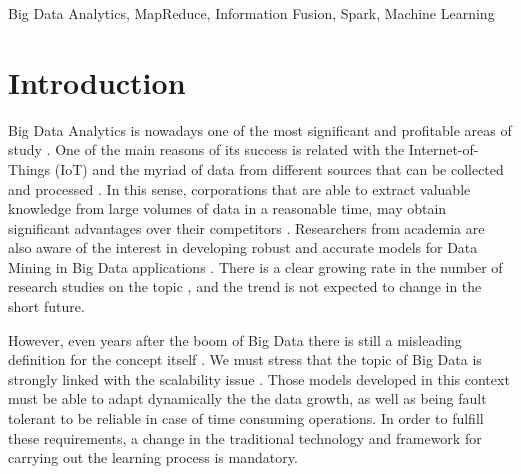 \documentclass[3p,review]{elsarticle}
\begin{document}
\begin{frontmatter}
\begin{abstract}

\end{abstract}

\begin{keyword}
Big Data Analytics, MapReduce, Information Fusion, Spark, Machine Learning
\end{keyword}

\end{frontmatter}

\section{Introduction}\label{sec:intro}


Big Data Analytics is nowadays one of the most significant and profitable areas of study \cite{Chen12-BI-BD, Min13-BDAnalBook, Kam14, Fer14, davis17}. One of the main reasons of its success is related with the Internet-of-Things (IoT) and the myriad of data from different sources that can be collected and processed \cite{Fuqaha15-IoT, Xu14-IoT}. In this sense, corporations that are able to extract valuable knowledge from large volumes of data in a reasonable time, may obtain significant advantages over their competitors \cite{Lar16-BI,Choi17-BDAnal}. Researchers from academia are also aware of the interest in developing robust and accurate models for Data Mining in Big Data applications \cite{wu14, Wix14-BDAcad}. There is a clear growing rate in the number of research studies on the topic \cite{Abb16-BDIS}, and the trend is not expected to change in the short future.

However, even years after the boom of Big Data there is still a misleading definition for the concept itself \cite{Gan15-BDhype}. We must stress that the topic of Big Data is strongly linked with the scalability issue \cite{Hu14-ScalBDAnal}. Those models developed in this context must be able to adapt dynamically the the data growth, as well as being fault tolerant to be reliable in case of time consuming operations. In order to fulfill these requirements, a change in the traditional technology and framework for carrying out the learning process is mandatory. 
\end{document}
